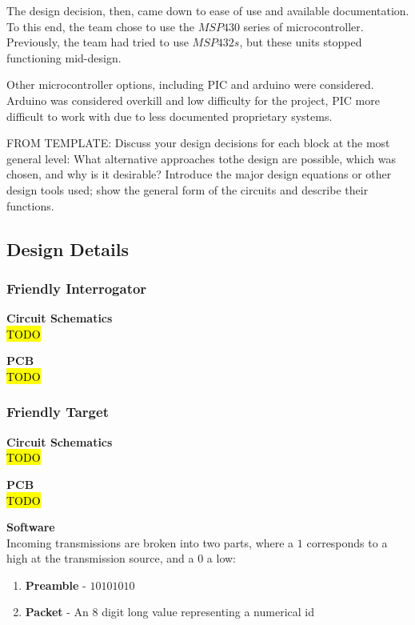 \documentclass[letterpaper,10pt]{article}
\begin{document}
\begin{spacing}{1.15}
The design decision, then, came down to ease of use and available documentation. To this end, the team chose to use the $MSP430$ series of microcontroller. Previously, the team had tried to use $MSP432s$, but these units stopped functioning mid-design. 

Other microcontroller options, including PIC and arduino were considered. Arduino was considered overkill and low difficulty for the project, PIC more difficult to work with due to less documented proprietary systems.

FROM TEMPLATE: Discuss your design decisions for each block at the most general level: What alternative approaches tothe design are possible, which was chosen, and why is it desirable? Introduce the major design equations or other design tools used; show the general form of the circuits and describe their functions.



\subsection{Design Details}

\subsubsection{Friendly Interrogator}
\hspace{5mm}\textbf{Circuit Schematics} \label{section:interrogator-circuit-schematics-design-details}
\\ \hl{TODO}

\hspace{5mm}\textbf{PCB} \label{section:interrogator-pcb-design-details}
\\ \hl{TODO}


\subsubsection{Friendly Target}
\hspace{5mm}\textbf{Circuit Schematics} \label{section:target-circuit-schematics-design-details}
\\ \hl{TODO}

\hspace{5mm}\textbf{PCB} \label{section:target-pcb-design-details}
\\ \hl{TODO}

\hspace{5mm} \textbf{Software} \label{section:target-software-design-details}\\
Incoming transmissions are broken into two parts, where a $1$ corresponds to a high at the transmission source, and a $0$ a low: 
\begin{enumerate}
	\small
	\item \textbf{Preamble} - $10101010$ 
	\item \textbf{Packet} - An 8 digit long value representing a numerical id
\end{enumerate}


\end{spacing}
\end{document}
